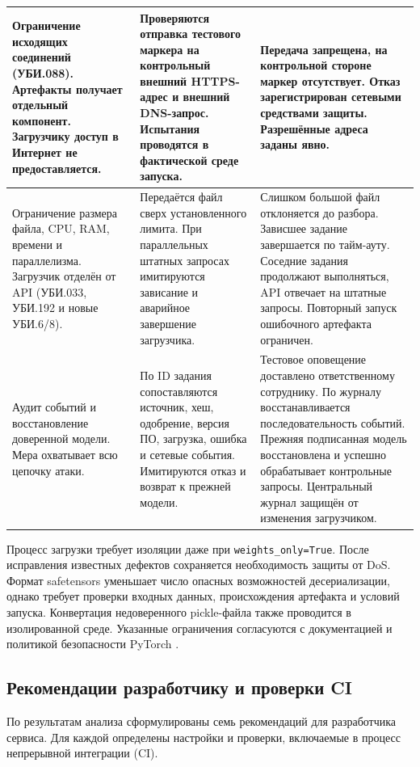 \documentclass[12pt,a4paper]{report}
\begin{document}
\begin{longtable}{|P{4.1cm}|P{5.1cm}|P{4.6cm}|}
\hline
Ограничение исходящих соединений (УБИ.088). Артефакты получает отдельный компонент. Загрузчику доступ в Интернет не предоставляется. & Проверяются отправка тестового маркера на контрольный внешний HTTPS-адрес и внешний DNS-запрос. Испытания проводятся в фактической среде запуска. & Передача запрещена, на контрольной стороне маркер отсутствует. Отказ зарегистрирован сетевыми средствами защиты. Разрешённые адреса заданы явно. \\
\hline
Ограничение размера файла, CPU, RAM, времени и параллелизма. Загрузчик отделён от API (УБИ.033, УБИ.192 и новые УБИ.6/8). & Передаётся файл сверх установленного лимита. При параллельных штатных запросах имитируются зависание и аварийное завершение загрузчика. & Слишком большой файл отклоняется до разбора. Зависшее задание завершается по тайм-ауту. Соседние задания продолжают выполняться, API отвечает на штатные запросы. Повторный запуск ошибочного артефакта ограничен. \\
\hline
Аудит событий и восстановление доверенной модели. Мера охватывает всю цепочку атаки. & По ID задания сопоставляются источник, хеш, одобрение, версия ПО, загрузка, ошибка и сетевые события. Имитируются отказ и возврат к прежней модели. & Тестовое оповещение доставлено ответственному сотруднику. По журналу восстанавливается последовательность событий. Прежняя подписанная модель восстановлена и успешно обрабатывает контрольные запросы. Центральный журнал защищён от изменения загрузчиком. \\
\hline
\end{longtable}
\endgroup

Процесс загрузки требует изоляции даже при \texttt{weights\_only=True}. После исправления известных дефектов сохраняется необходимость защиты от DoS. Формат safetensors уменьшает число опасных возможностей десериализации, однако требует проверки входных данных, происхождения артефакта и условий запуска. Конвертация недоверенного pickle-файла также проводится в изолированной среде. Указанные ограничения согласуются с документацией и политикой безопасности PyTorch \cite{torchserialization,torchsecurity}.

\subsection{Рекомендации разработчику и проверки CI}

По результатам анализа сформулированы семь рекомендаций для разработчика сервиса. Для каждой определены настройки и проверки, включаемые в процесс непрерывной интеграции (CI).
\end{document}
